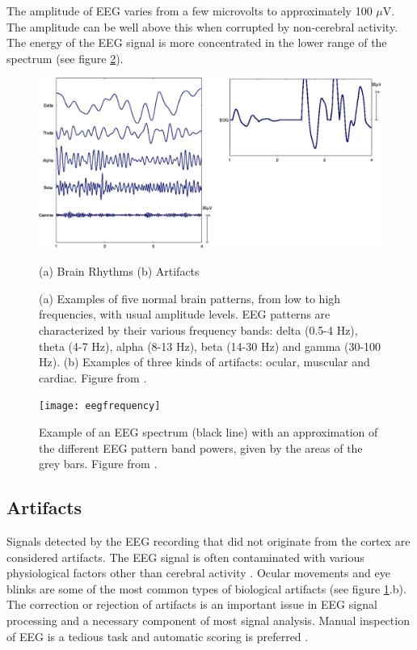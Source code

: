 \documentclass[twoside]{article}
\begin{document}
The amplitude of EEG varies from a few microvolts to approximately 100 $\mu$V. The amplitude can be well above this when corrupted by non-cerebral activity. The energy of the EEG signal is more concentrated in the lower range of the spectrum (see figure \ref{fig:freqency}). 
\begin{figure}
\centering

  \includegraphics[width=.99\linewidth]{brainrythyms}
  \captionsetup{singlelinecheck = true, justification=raggedright }
    \caption*{ (a) Brain Rhythms \qquad \qquad\qquad \qquad  \qquad \qquad \qquad (b) Artifacts \qquad \qquad }

  \caption{(a) Examples of five normal brain patterns, from low to high frequencies, with usual amplitude levels. EEG patterns are characterized by their various frequency bands: delta (0.5-4 Hz), theta (4-7 Hz), alpha (8-13 Hz), beta (14-30 Hz) and gamma (30-100 Hz). (b) Examples of three kinds of artifacts: ocular, muscular and cardiac. Figure from \cite{eegguidelines}.}
  

\label{fig:patterns}
\end{figure}


\begin{figure}
\centering

  \texttt{[image: eegfrequency]}
  \caption{Example of an EEG spectrum (black line) with an approximation of the different EEG pattern band powers, given by the areas of the grey bars. Figure from \cite{freqplaatje}.}
  

\label{fig:freqency}
\end{figure}


\subsection{Artifacts}
Signals detected by the EEG recording that did not originate from the cortex are considered artifacts. The EEG signal is often contaminated with various physiological factors other than cerebral activity \cite{eegguidelines}. Ocular movements and eye blinks are some of the most common types of biological artifacts (see figure \ref{fig:patterns}.b). The correction or rejection of artifacts is an important issue in EEG signal processing and a necessary component of most signal analysis. Manual inspection of EEG is a tedious task and automatic scoring is preferred \cite{nasa}. 
\end{document}
